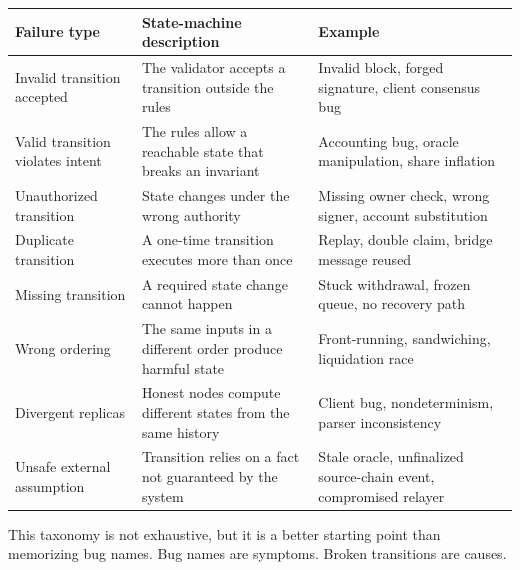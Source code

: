 {\def\LTcaptype{none} %
\begin{longtable}[]{@{}
  >{\raggedright\arraybackslash}p{}
  >{\raggedright\arraybackslash}p{}
  >{\raggedright\arraybackslash}p{}@{}}
\toprule\noalign{}
\begin{minipage}[b]{\linewidth}\raggedright
Failure type
\end{minipage} & \begin{minipage}[b]{\linewidth}\raggedright
State-machine description
\end{minipage} & \begin{minipage}[b]{\linewidth}\raggedright
Example
\end{minipage} \\
\midrule\noalign{}
\endhead
\bottomrule\noalign{}
\endlastfoot
Invalid transition accepted & The validator accepts a transition outside
the rules & Invalid block, forged signature, client consensus bug \\
Valid transition violates intent & The rules allow a reachable state
that breaks an invariant & Accounting bug, oracle manipulation, share
inflation \\
Unauthorized transition & State changes under the wrong authority &
Missing owner check, wrong signer, account substitution \\
Duplicate transition & A one-time transition executes more than once &
Replay, double claim, bridge message reused \\
Missing transition & A required state change cannot happen & Stuck
withdrawal, frozen queue, no recovery path \\
Wrong ordering & The same inputs in a different order produce harmful
state & Front-running, sandwiching, liquidation race \\
Divergent replicas & Honest nodes compute different states from the same
history & Client bug, nondeterminism, parser inconsistency \\
Unsafe external assumption & Transition relies on a fact not guaranteed
by the system & Stale oracle, unfinalized source-chain event,
compromised relayer \\
\end{longtable}
}

This taxonomy is not exhaustive, but it is a better starting point than
memorizing bug names. Bug names are symptoms. Broken transitions are
causes.

